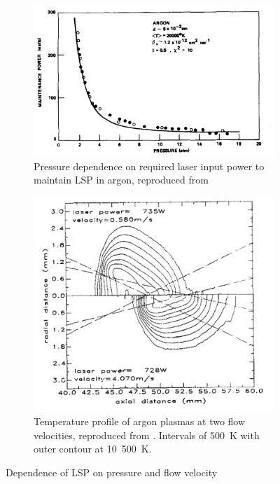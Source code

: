         \begin{figure}[h]
            \centering
            \begin{subfigure}[t]{0.50\textwidth}
                \centering
                \includegraphics[width=\textwidth]{assets/2 background/moody_ArgonLSP.png}
                \caption[Pressure dependence on required laser input power to maintain LSP in argon]{Pressure dependence on required laser input power to maintain LSP in argon, reproduced from \textcite{moodyMaintenanceGasBreakdown1975}}
                \label{fig:4_moodyArgon}
            \end{subfigure}
            \hfill
            \begin{subfigure}[t]{0.45\textwidth}
                \centering
                \includegraphics[width=\textwidth]{assets/2 background/welle_TProfile.png}
                \caption[Temperature profile of argon plasmas at two flow velocities]{Temperature profile of argon plasmas at two flow velocities, reproduced from \textcite{welleEnergyConversionEfficiency1986}. Intervals of 500~K with outer contour at 10~500~K.}
                \label{fig:4_LSPTProfile}
            \end{subfigure}
            \caption{Dependence of LSP on pressure and flow velocity}
            \label{fig:4_conditions}
        \end{figure}

